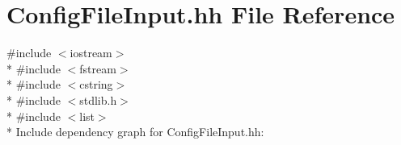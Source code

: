\hypertarget{_config_file_input_8hh}{}\section{Config\+File\+Input.\+hh File Reference}
\label{_config_file_input_8hh}
{\ttfamily \#include $<$iostream$>$}\\*
{\ttfamily \#include $<$fstream$>$}\\*
{\ttfamily \#include $<$cstring$>$}\\*
{\ttfamily \#include $<$stdlib.\+h$>$}\\*
{\ttfamily \#include $<$list$>$}\\*
Include dependency graph for Config\+File\+Input.\+hh\+:
